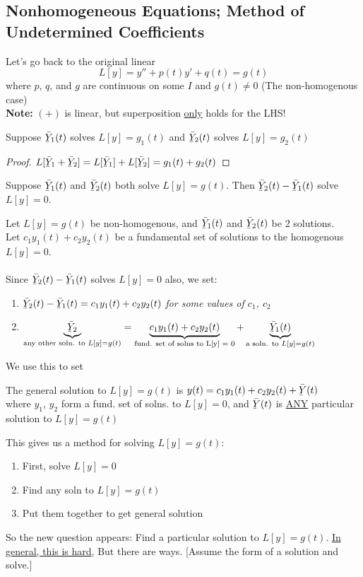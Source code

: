 \subsection*{Nonhomogeneous Equations; Method of Undetermined Coefficients}
Let's go back to the original linear
\begin{equation*}
	L[y] = y'' + p(t)y' + q(t) = g(t) \tag{+}
\end{equation*}
where $p$, $q$, and $g$ are continuous on some $I$ and $g(t) \neq 0$ (The non-homogenous case)\\
{\textbf{Note:}} $(+)$ is linear, but superposition \underline{only} holds for the LHS!
\begin{theorem}
	Suppose $\Ylines_1 (t)$ solves $L[y] = g_1(t)$ and $\Ylines_2 (t)$ solves $L[y] = g_2(t)$
\end{theorem}
\begin{proof}
	$L[\Ylines_1 + \Ylines_2] = L[\Ylines_1] + L[\Ylines_2] = g_1(t) + g_2(t)$
\end{proof}
\begin{corollary}
	Suppose $\Ylines_1 (t)$ and $\Ylines_2 (t)$ both solve $L[y] = g(t)$. Then $\Ylines_2 (t) - \Ylines_1(t)$ solve $L[y] = 0$.
\end{corollary}
Let $L[y] = g(t)$ be non-homogenous, and $\Ylines_1(t)$ and $\Ylines_2(t)$ be 2 solutions.\\
Let $c_1y_1(t) + c_2y_2(t)$ be a fundamental set of solutions to the homogenous $L[y] = 0$.\\\\
Since $\Ylines_2 (t) - \Ylines_1(t)$ solves $L[y] = 0$ also, we set:
\begin{enumerate}[label=\protect\circled{\Roman*}]
	\item $\Ylines_2 (t) - \Ylines_1(t) = c_1y_1(t) + c_2y_2(t)$ \textit{for some values of $c_1$, $c_2$} 
	\item $\underbrace{\Ylines_2}_{\text{any other soln. to } L[y] = g(t) } = \underbrace{c_1y_1(t) + c_2y_2(t)}_{\text{fund. set of solns to L[y] = 0}} + \underbrace{\Ylines_1(t)}_{\text{a soln. to } L[y] = g(t)}$ 
\end{enumerate}
We use this to set
\begin{theorem}
	The general solution to $L[y] = g(t)$ is $y(t) = c_1y_1(t) + c_2y_2(t) + \Ylines(t)$\\
	where $y_1$, $y_2$ form a fund. set of solns. to $L[y] = 0$, and $\Ylines(t)$ is \underline{ANY} particular solution to $L[y] = g(t)$
\end{theorem}
This gives us a method for solving $L[y] = g(t)$:
\begin{enumerate}[label=\protect\circled{\Roman*}]
	\item First, solve $L[y] = 0$
	\item Find any soln to $L[y] = g(t)$
	\item Put them together to get general solution
\end{enumerate}
So the new question appears: Find a particular solution to $L[y] = g(t)$. 
\underline{In general, this is hard}, But there are ways. [Assume the form of a solution and solve.]
